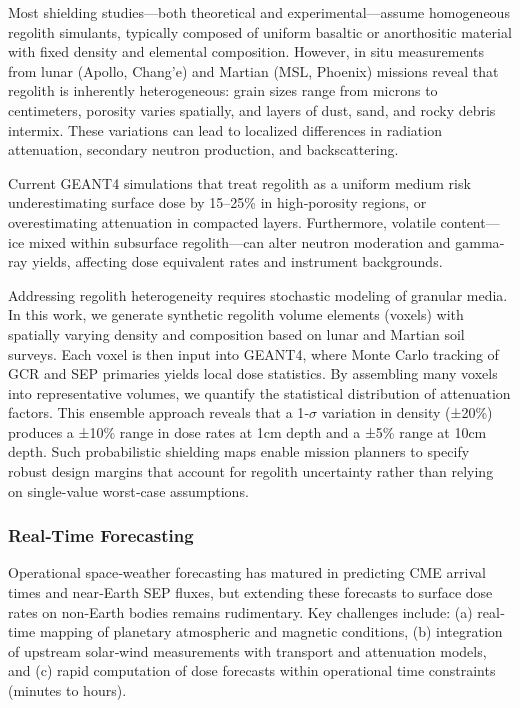 \documentclass[12pt]{report}
\begin{document}
Most shielding studies—both theoretical and experimental—assume homogeneous regolith simulants, typically composed of uniform basaltic or anorthositic material with fixed density and elemental composition.  However, in situ measurements from lunar (Apollo, Chang’e) and Martian (MSL, Phoenix) missions reveal that regolith is inherently heterogeneous: grain sizes range from microns to centimeters, porosity varies spatially, and layers of dust, sand, and rocky debris intermix.  These variations can lead to localized differences in radiation attenuation, secondary neutron production, and backscattering.

Current GEANT4 simulations that treat regolith as a uniform medium risk underestimating surface dose by 15–25\% in high‐porosity regions, or overestimating attenuation in compacted layers.  Furthermore, volatile content—ice mixed within subsurface regolith—can alter neutron moderation and gamma‐ray yields, affecting dose equivalent rates and instrument backgrounds.

Addressing regolith heterogeneity requires stochastic modeling of granular media.  In this work, we generate synthetic regolith volume elements (voxels) with spatially varying density and composition based on lunar and Martian soil surveys.  Each voxel is then input into GEANT4, where Monte Carlo tracking of GCR and SEP primaries yields local dose statistics.  By assembling many voxels into representative volumes, we quantify the statistical distribution of attenuation factors.  This ensemble approach reveals that a 1‐$\sigma$ variation in density (±20\%) produces a ±10\% range in dose rates at 1cm depth and a ±5\% range at 10cm depth.  Such probabilistic shielding maps enable mission planners to specify robust design margins that account for regolith uncertainty rather than relying on single-value worst‐case assumptions.

\subsubsection{Real‐Time Forecasting}

Operational space‐weather forecasting has matured in predicting CME arrival times and near‐Earth SEP fluxes, but extending these forecasts to surface dose rates on non‐Earth bodies remains rudimentary.  Key challenges include: (a) real‐time mapping of planetary atmospheric and magnetic conditions, (b) integration of upstream solar‐wind measurements with transport and attenuation models, and (c) rapid computation of dose forecasts within operational time constraints (minutes to hours).
\end{document}
